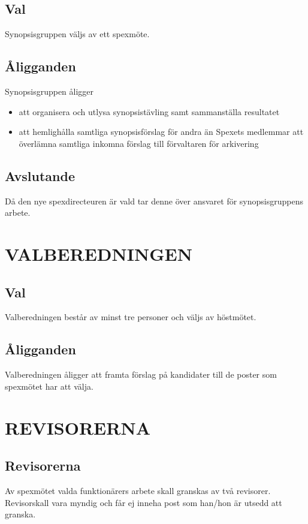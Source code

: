 \documentclass[a4paper]{article}
\begin{document}
\subsection{Val}
Synopsisgruppen väljs av ett spexmöte.

\subsection{Åligganden}
Synopsisgruppen åligger

\begin{itemize}
  \item att organisera och utlysa synopsistävling samt sammanställa resultatet
  \item att hemlighålla samtliga synopsisförslag för andra än Spexets medlemmar att överlämna samtliga inkomna förslag till förvaltaren för arkivering
\end{itemize}

\subsection{Avslutande}
Då den nye spexdirecteuren är vald tar denne över ansvaret för synopsisgruppens arbete.

\section{VALBEREDNINGEN}
\label{section:valberedningen}

\subsection{Val}
Valberedningen består av minst tre personer och väljs av höstmötet.

\subsection{Åligganden}
Valberedningen åligger att framta förslag på kandidater till de poster som spexmötet har att välja.

\section{REVISORERNA}
\label{section:revisorerna}

\subsection{Revisorerna}
Av spexmötet valda funktionärers arbete skall granskas av två revisorer. Revisorskall vara myndig och får ej inneha post som han/hon är utsedd att granska.
\end{document}
